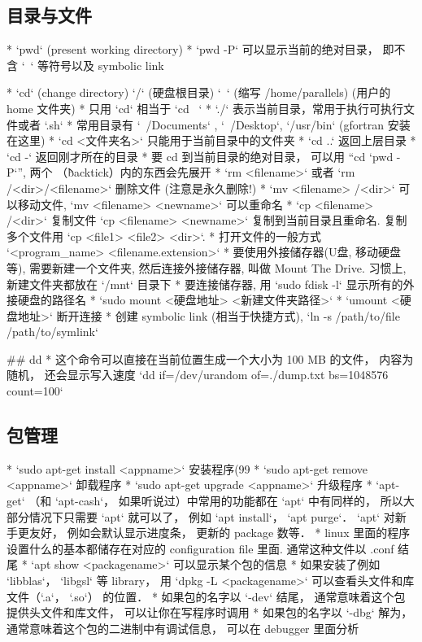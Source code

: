 
\subsection{目录与文件}
\begin{itemize}
* `pwd` (present working directory)
* `pwd -P` 可以显示当前的绝对目录， 即不含 `~` 等符号以及 symbolic link

* `cd` (change directory) `/` (硬盘根目录) `~` (缩写 /home/parallels) (用户的 home 文件夹)
* 只用 `cd` 相当于 `cd ~`
* `./` 表示当前目录，常用于执行可执行文件或者 `.sh`
* 常用目录有 `~/Documents` ,  `~/Desktop`, `/usr/bin` (gfortran 安装在这里)
* `cd <文件夹名>` 只能用于当前目录中的文件夹
* `cd ..` 返回上层目录
* `cd -` 返回刚才所在的目录
* 要 cd 到当前目录的绝对目录， 可以用 “cd `pwd -P`”, 两个 \` （backtick）内的东西会先展开
* `rm <filename>` 或者 `rm /<dir>/<filename>` 删除文件  (注意是永久删除!)
* `mv <filename> /<dir>` 可以移动文件, `mv <filename> <newname>` 可以重命名
* `cp <filename> /<dir>` 复制文件 `cp <filename> <newname>` 复制到当前目录且重命名. 复制多个文件用 `cp <file1> <file2> <dir>`.
* 打开文件的一般方式 `<program_name> <filename.extension>`
* 要使用外接储存器(U盘, 移动硬盘等), 需要新建一个文件夹, 然后连接外接储存器, 叫做 Mount The Drive. 习惯上, 新建文件夹都放在 `/mnt` 目录下
* 要连接储存器, 用 `sudo fdisk -l` 显示所有的外接硬盘的路径名
* `sudo mount <硬盘地址> <新建文件夹路径>`
* `umount <硬盘地址>` 断开连接
* 创建 symbolic link (相当于快捷方式), `ln -s /path/to/file /path/to/symlink`

## dd
* 这个命令可以直接在当前位置生成一个大小为 100 MB 的文件， 内容为随机， 还会显示写入速度
`dd if=/dev/urandom of=./dump.txt bs=1048576 count=100`
\end{itemize}


\subsection{包管理}
\begin{itemize}
* `sudo apt-get install <appname>` 安装程序(99%
* `sudo apt-get remove <appname>` 卸载程序
* `sudo apt-get upgrade <appname>` 升级程序
* `apt-get` （和 `apt-cash`， 如果听说过）中常用的功能都在 `apt` 中有同样的， 所以大部分情况下只需要 `apt` 就可以了， 例如 `apt install`， `apt purge`． `apt` 对新手更友好， 例如会默认显示进度条， 更新的 package 数等．
* linux 里面的程序设置什么的基本都储存在对应的 configuration file 里面. 通常这种文件以 .conf 结尾
* `apt show <packagename>` 可以显示某个包的信息
* 如果安装了例如 `libblas`， `libgsl` 等 library， 用 `dpkg -L <packagename>` 可以查看头文件和库文件（`.a`， `.so`） 的位置．
* 如果包的名字以 `-dev` 结尾， 通常意味着这个包提供头文件和库文件， 可以让你在写程序时调用
* 如果包的名字以 `-dbg` 解为， 通常意味着这个包的二进制中有调试信息， 可以在 debugger 里面分析
\end{itemize}

